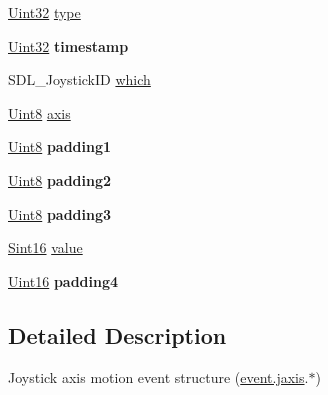 \begin{DoxyCompactItemize}
\item 
\hyperlink{_s_d_l__stdinc_8h_add440eff171ea5f55cb00c4a9ab8672d}{Uint32} \hyperlink{struct_s_d_l___joy_axis_event_aed1c873fb90ba58194e65f972933c67d}{type}
\item 
\hypertarget{struct_s_d_l___joy_axis_event_a60ecfc70df9eeef8e33b5dd7dc060389}{}\hyperlink{_s_d_l__stdinc_8h_add440eff171ea5f55cb00c4a9ab8672d}{Uint32} {\bfseries timestamp}\label{struct_s_d_l___joy_axis_event_a60ecfc70df9eeef8e33b5dd7dc060389}

\item 
S\+D\+L\+\_\+\+Joystick\+I\+D \hyperlink{struct_s_d_l___joy_axis_event_a965719f4703a7091bcc5f07f79fcf7e1}{which}
\item 
\hyperlink{_s_d_l__stdinc_8h_a2944638813a090aa23e62f4da842c3e2}{Uint8} \hyperlink{struct_s_d_l___joy_axis_event_a0beac2fb161e45771c424bd0b6daeabb}{axis}
\item 
\hypertarget{struct_s_d_l___joy_axis_event_ae8e17bced478530638982f0382a0dafa}{}\hyperlink{_s_d_l__stdinc_8h_a2944638813a090aa23e62f4da842c3e2}{Uint8} {\bfseries padding1}\label{struct_s_d_l___joy_axis_event_ae8e17bced478530638982f0382a0dafa}

\item 
\hypertarget{struct_s_d_l___joy_axis_event_ad5407250032f618fde7437ac5f229257}{}\hyperlink{_s_d_l__stdinc_8h_a2944638813a090aa23e62f4da842c3e2}{Uint8} {\bfseries padding2}\label{struct_s_d_l___joy_axis_event_ad5407250032f618fde7437ac5f229257}

\item 
\hypertarget{struct_s_d_l___joy_axis_event_a8bf5144fddc19686c2003add1f0e1565}{}\hyperlink{_s_d_l__stdinc_8h_a2944638813a090aa23e62f4da842c3e2}{Uint8} {\bfseries padding3}\label{struct_s_d_l___joy_axis_event_a8bf5144fddc19686c2003add1f0e1565}

\item 
\hyperlink{_s_d_l__stdinc_8h_a9d0257032c0e146ab6121bf0122712f5}{Sint16} \hyperlink{struct_s_d_l___joy_axis_event_a53ee73e7c367934dd6edb69963be5556}{value}
\item 
\hypertarget{struct_s_d_l___joy_axis_event_a604b258940a8cd8beaa5efeb55d6f825}{}\hyperlink{_s_d_l__stdinc_8h_a31fcc0a076c9068668173ee26d33e42b}{Uint16} {\bfseries padding4}\label{struct_s_d_l___joy_axis_event_a604b258940a8cd8beaa5efeb55d6f825}

\end{DoxyCompactItemize}


\subsection{Detailed Description}
Joystick axis motion event structure (\hyperlink{union_s_d_l___event_ac4611acd0e9c675e67dc20919f0accb4}{event.\+jaxis}.$\ast$) 

